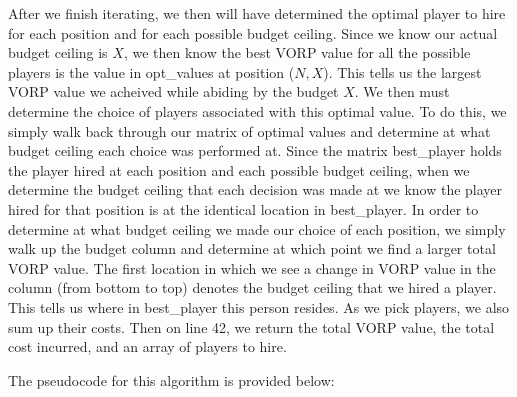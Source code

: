 \documentclass[11pt]{article}
\begin{document}
After we finish iterating, we then will have determined the optimal player to hire for each position and for each possible budget ceiling. Since we know our actual budget ceiling is $X$, we then know the best VORP value for all the possible players is the value in opt\_values at position ($N,X$). This tells us the largest VORP value we acheived while abiding by the budget $X$. We then must determine the choice of players associated with this optimal value. To do this, we simply walk back through our matrix of optimal values and determine at what budget ceiling each choice was performed at. Since the matrix best\_player holds the player hired at each position and each possible budget ceiling, when we determine the budget ceiling that each decision was made at we know the player hired for that position is at the identical location in best\_player. In order to determine at what budget ceiling we made our choice of each position, we simply walk up the budget column and determine at which point we find a larger total VORP value. The first location in which we see a change in VORP value in the column (from bottom to top) denotes the budget ceiling that we hired a player. This tells us where in best\_player this person resides. As we pick players, we also sum up their costs. Then on line 42, we return the total VORP value, the total cost incurred, and an array of players to hire.

The pseudocode for this algorithm is provided below:
\end{document}
